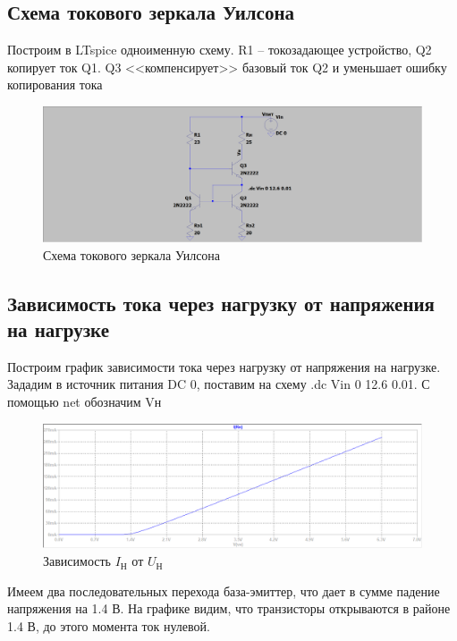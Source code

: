 \documentclass[a4paper, 12pt]{article}
\begin{document}
    \subsection{Схема токового зеркала Уилсона}
    Построим в LTspice одноименную схему. R1 -- токозадающее устройство,
    Q2 копирует ток Q1. Q3 <<компенсирует>> базовый ток Q2 и уменьшает ошибку копирования тока
    \begin{figure}[H]
        \centering
        \includegraphics[scale=0.22]{scheme2.png}
        \captionsetup{skip=0pt}
        \caption{Схема токового зеркала Уилсона}
        \label{fig:scheme2}
    \end{figure}


    \subsection{Зависимость тока через нагрузку от напряжения на нагрузке}
    Построим график зависимости тока через нагрузку от напряжения на нагрузке.
    Зададим в источник питания DC 0, поставим на схему .dc Vin 0 12.6 0.01.
    С помощью net обозначим Vн
    \begin{figure}[H]
        \centering
        \includegraphics[scale=0.46]{2task_Iн(Vн).png}
        \captionsetup{skip=0pt}
        \caption{Зависимость $I_\text{Н}$ от $U_\text{Н}$}
        \label{fig:2task_InVn}
    \end{figure}
    \noindent Имеем два последовательных перехода база-эмиттер, что дает в сумме падение напряжения на 1.4 В.
    На графике видим, что транзисторы открываются в районе 1.4 В, до этого момента ток нулевой.
\end{document}
